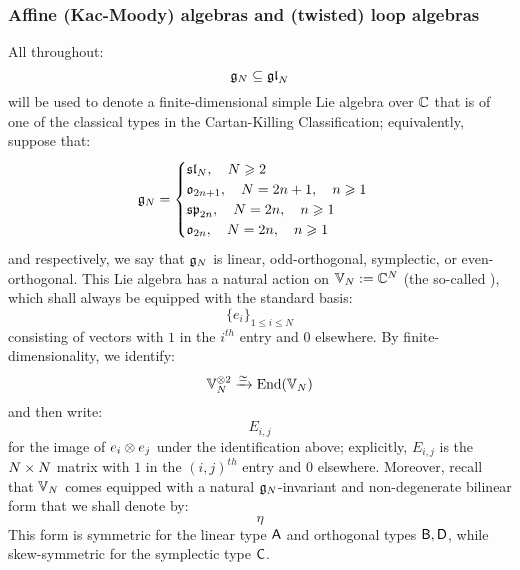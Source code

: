         \subsubsection{Affine (Kac-Moody) algebras and (twisted) loop algebras} 
            All throughout:
                $$\mathfrak{g}_N \subseteq \mathfrak{gl}_N$$
            will be used to denote a finite-dimensional simple Lie algebra over $\mathbb{C}$ that is of one of the classical types in the Cartan-Killing Classification; equivalently, suppose that:
                $$
                    \mathfrak{g}_N =
                    \begin{cases}
                        \mathfrak{sl}_N, \quad N \geqslant 2
                        \\
                        \mathfrak{o}_{2n + 1}, \quad N = 2n + 1, \quad n \geqslant 1
                        \\
                        \mathfrak{sp}_{2n}, \quad N = 2n, \quad n \geqslant 1
                        \\
                        \mathfrak{o}_{2n}, \quad N = 2n, \quad n \geqslant 1
                    \end{cases}
                $$
            and respectively, we say that $\mathfrak{g}_N$ is linear, odd-orthogonal, symplectic, or even-orthogonal. This Lie algebra has a natural action on $\mathbb{V}_N := \mathbb{C}^N$ (the so-called ), which shall always be equipped with the standard basis:
                $$\{e_i\}_{1 \leq i \leq N}$$
            consisting of vectors with $1$ in the $i^{th}$ entry and $0$ elsewhere. By finite-dimensionality, we identify:
                $$\bbV_N^{\tensor 2} \xrightarrow[]{\cong} \End(\bbV_N)$$
            and then write:
                $$E_{i, j}$$
            for the image of $e_i \tensor e_j$ under the identification above; explicitly, $E_{i, j}$ is the $N \x N$ matrix with $1$ in the $(i, j)^{th}$ entry and $0$ elsewhere. Moreover, recall that $\mathbb{V}_N$ comes equipped with a natural $\mathfrak{g}_N$-invariant and non-degenerate bilinear form that we shall denote by:
                $$\eta$$
            This form is symmetric for the linear type $\mathsf{A}$ and orthogonal types $\mathsf{B}, \mathsf{D}$, while skew-symmetric for the symplectic type $\mathsf{C}$.
        
